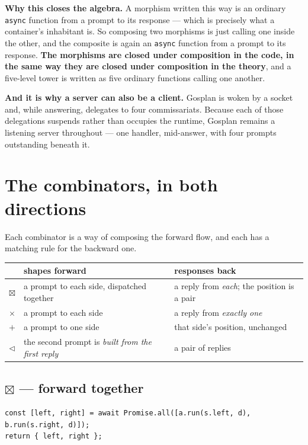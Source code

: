 \documentclass[11pt,a4paper]{article}
\newcommand{\note}[1]{\medskip\noindent\textbf{\textcolor{warn}{#1}}\quad}
\begin{document}
\note{Why this closes the algebra.} A morphism written this way is an ordinary
\texttt{async} function from a prompt to its response --- which is precisely what
a container's inhabitant is. So composing two morphisms is just calling one
inside the other, and the composite is again an \texttt{async} function from a
prompt to its response. \textbf{The morphisms are closed under composition in
the code, in the same way they are closed under composition in the theory}, and
a five-level tower is written as five ordinary functions calling one another.

\note{And it is why a server can also be a client.} Gosplan is woken by a socket
and, while answering, delegates to four commissariats. Because each of those
delegations suspends rather than occupies the runtime, Gosplan remains a
listening server throughout --- one handler, mid-answer, with four prompts
outstanding beneath it.

\section{The combinators, in both directions}

Each combinator is a way of composing the forward flow, and each has a matching
rule for the backward one.

\begin{center}
\footnotesize
\begin{tabular}{@{}cll@{}}
\toprule
& \textbf{shapes forward} & \textbf{responses back} \\
\midrule
$\boxtimes$ & a prompt to each side, dispatched together & a reply from \emph{each}; the position is a pair \\
$\times$    & a prompt to each side                      & a reply from \emph{exactly one} \\
$+$         & a prompt to one side                       & that side's position, unchanged \\
$\lhd$      & the second prompt is \emph{built from the first reply} & a pair of replies \\
\bottomrule
\end{tabular}
\end{center}

\subsection*{$\boxtimes$ --- forward together}

\begin{lstlisting}
const [left, right] = await Promise.all([a.run(s.left, d), b.run(s.right, d)]);
return { left, right };
\end{lstlisting}
\end{document}
